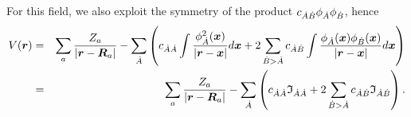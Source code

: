 For this field, we also exploit the symmetry of the product $c_{\dot{A}\dot{B}}\phi_{\dot{A}}\phi_{\dot{B}}$, hence
%
\begin{eqnarray}
   V(\boldsymbol{r})&=&\sum_a\frac{Z_a}{|\boldsymbol{r}-\boldsymbol{R}_a|}-
   \sum_{\dot{A}}\left(c_{\dot{A}\dot{A}}\int\frac{\phi_{\dot{A}}^2(\boldsymbol{x})}{|\boldsymbol{r}-\boldsymbol{x}|}d\boldsymbol{x}+2\sum_{\dot{B}>\dot{A}}c_{\dot{A}\dot{B}}\int\frac{\phi_{\dot{A}}(\boldsymbol{x})\phi_{\dot{B}}(\boldsymbol{x})}{|\boldsymbol{r}-\boldsymbol{x}|}d\boldsymbol{x}\right)\nonumber\\
   &=&\sum_a\frac{Z_a}{|\boldsymbol{r}-\boldsymbol{R}_a|}-
   \sum_{\dot{A}}\left(c_{\dot{A}\dot{A}}\mathfrak{I}_{\dot{A}\dot{A}}+2\sum_{\dot{B}>\dot{A}}c_{\dot{A}\dot{B}}\mathfrak{I}_{\dot{A}\dot{B}}\right).
\end{eqnarray}
%

